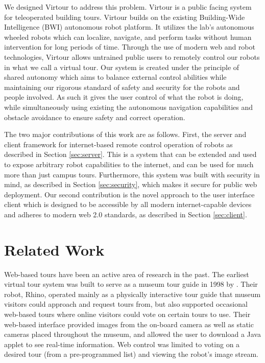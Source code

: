 \documentclass[
  oneside,
  11pt, a4paper,
  footinclude=true,
  headinclude=true,
  cleardoublepage=empty
]{article}
\begin{document}
We designed Virtour to address this problem. Virtour is a public facing system
for teleoperated building tours. Virtour builds on the existing Building-Wide
Intelligence (BWI) autonomous robot platform. It utilizes the lab's autonomous
wheeled robots which can localize, navigate, and perform tasks without human
intervention for long periods of time. Through the use of modern web and robot
technologies, Virtour allows untrained public users to remotely control our
robots in what we call a virtual tour. Our system is created under the
principle of shared autonomy which aims to balance external control abilities
while maintaining our rigorous standard of safety and security for the robots
and people involved. As such it gives the user control of what the robot is
doing, while simultaneously using existing the autonomous navigation
capabilities and obstacle avoidance to ensure safety and correct operation.

The two major contributions of this work are as follows. First, the server and
client framework for internet-based remote control operation of robots as
described in Section \ref{sec:server}. This is a system that can be extended
and used to expose arbitrary robot capabilities to the internet, and can be
used for much more than just campus tours. Furthermore, this system was built
with security in mind, as described in Section \ref{sec:security}, which makes
it secure for public web deployment. Our second contribution is the novel
approach to the user interface client which is designed to be accessible by all
modern internet-capable devices and adheres to modern web 2.0 standards, as
described in Section \ref{sec:client}.

\section{Related Work}\label{sec:related}

Web-based tours have been an active area of research in the past. The earliest
virtual tour system was built to serve as a museum tour guide in 1998 by
\citet{burgard1998}. Their robot, Rhino, operated mainly as a physically
interactive tour guide that museum visitors could approach and request tours
from, but also supported occasional web-based tours where online visitors could
vote on certain tours to use. Their web-based interface provided images from
the on-board camera as well as static cameras placed throughout the museum, and
allowed the user to download a Java applet to see real-time information. Web
control was limited to voting on a desired tour (from a pre-programmed list)
and viewing the robot's image stream.
\end{document}
